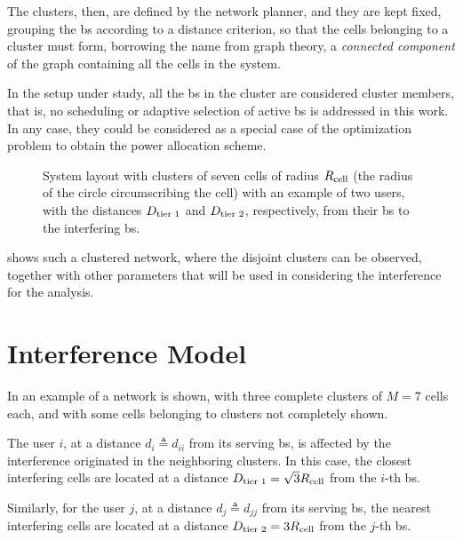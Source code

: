 The clusters, then, are defined by the network planner, and they are kept fixed,
grouping the \gls{bs} according to a distance criterion, so that the cells
belonging to a cluster must form, borrowing the name from graph theory, a
\emph{connected component} of the graph containing all the cells in the system.

In the setup under study, all the \gls{bs} in the cluster are considered cluster
members, that is, no scheduling or adaptive selection of active \gls{bs} is
addressed in this work. In any case, they could be considered as a special case
of the optimization problem to obtain the power allocation scheme.

\begin{figure}[t]
\begin{center}
    \dummybox
\end{center}
\caption{System layout with clusters of seven cells of radius $R_{\text{cell}}$ (the
    radius of the circle circumscribing the cell) with an example of two users,
    with the distances $D_{\text{tier 1}}$ and $D_{\text{tier 2}}$, respectively, from their \gls{bs} to
    the interfering \gls{bs}.}
\label{fig:achiev_cluster_layout}
\end{figure}

 shows such a clustered network, where the
disjoint clusters can be observed, together with other parameters that will be
used in considering the interference for the analysis.

\section{Interference Model}\label{sec:achiev_interf}

In  an example of a network is shown, with three
complete clusters of $M=7$ cells each, and with some cells belonging to clusters
not completely shown.

The user $i$, at a distance $d_i \triangleq d_{ii}$ from its serving \gls{bs},
is affected by the interference originated in the neighboring clusters. In this
case, the closest interfering cells are located at a distance $D_{\text{tier 1}} = \sqrt{3}
R_{\text{cell}}$ from the $i$-th \gls{bs}.

Similarly, for the user $j$, at a distance $d_j \triangleq d_{jj}$ from its
serving \gls{bs}, the nearest interfering cells are located at a distance
$D_{\text{tier 2}} = 3R_{\text{cell}}$ from the $j$-th \gls{bs}.

